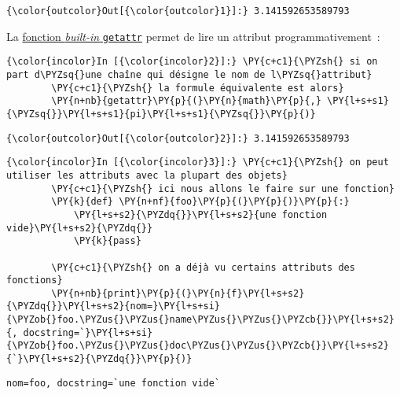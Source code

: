 \begin{Verbatim}[commandchars=\\\{\}]
{\color{outcolor}Out[{\color{outcolor}1}]:} 3.141592653589793
\end{Verbatim}
            
    La
\href{https://docs.python.org/3/library/functions.html\#getattr}{fonction
\emph{built-in} \texttt{getattr}} permet de lire un attribut
programmativement~:

    \begin{Verbatim}[commandchars=\\\{\}]
{\color{incolor}In [{\color{incolor}2}]:} \PY{c+c1}{\PYZsh{} si on part d\PYZsq{}une chaîne qui désigne le nom de l\PYZsq{}attribut}
        \PY{c+c1}{\PYZsh{} la formule équivalente est alors}
        \PY{n+nb}{getattr}\PY{p}{(}\PY{n}{math}\PY{p}{,} \PY{l+s+s1}{\PYZsq{}}\PY{l+s+s1}{pi}\PY{l+s+s1}{\PYZsq{}}\PY{p}{)}
\end{Verbatim}


\begin{Verbatim}[commandchars=\\\{\}]
{\color{outcolor}Out[{\color{outcolor}2}]:} 3.141592653589793
\end{Verbatim}
            
    \begin{Verbatim}[commandchars=\\\{\}]
{\color{incolor}In [{\color{incolor}3}]:} \PY{c+c1}{\PYZsh{} on peut utiliser les attributs avec la plupart des objets}
        \PY{c+c1}{\PYZsh{} ici nous allons le faire sur une fonction}
        \PY{k}{def} \PY{n+nf}{foo}\PY{p}{(}\PY{p}{)}\PY{p}{:} 
            \PY{l+s+s2}{\PYZdq{}}\PY{l+s+s2}{une fonction vide}\PY{l+s+s2}{\PYZdq{}}
            \PY{k}{pass}
        
        \PY{c+c1}{\PYZsh{} on a déjà vu certains attributs des fonctions}
        \PY{n+nb}{print}\PY{p}{(}\PY{n}{f}\PY{l+s+s2}{\PYZdq{}}\PY{l+s+s2}{nom=}\PY{l+s+si}{\PYZob{}foo.\PYZus{}\PYZus{}name\PYZus{}\PYZus{}\PYZcb{}}\PY{l+s+s2}{, docstring=`}\PY{l+s+si}{\PYZob{}foo.\PYZus{}\PYZus{}doc\PYZus{}\PYZus{}\PYZcb{}}\PY{l+s+s2}{`}\PY{l+s+s2}{\PYZdq{}}\PY{p}{)}
\end{Verbatim}


    \begin{Verbatim}[commandchars=\\\{\}]
nom=foo, docstring=`une fonction vide`

    \end{Verbatim}

